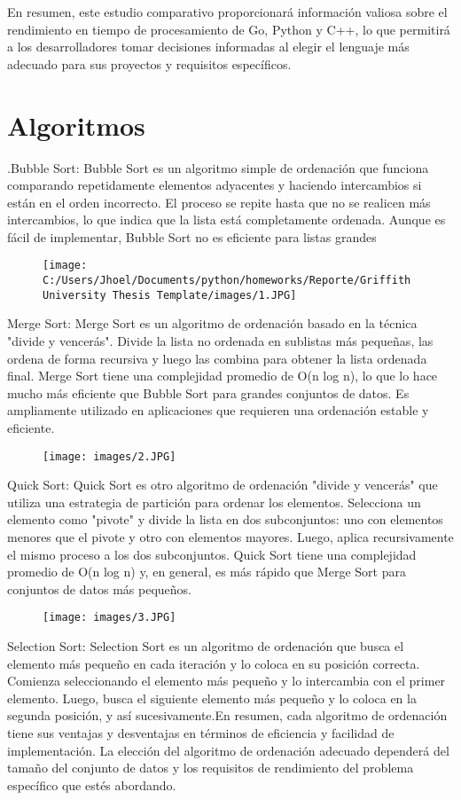 \documentclass[]{report}
\begin{document}
En resumen, este estudio comparativo proporcionará información valiosa sobre el rendimiento en tiempo de procesamiento de Go, Python y C++, lo que permitirá a los desarrolladores tomar decisiones informadas al elegir el lenguaje más adecuado para sus proyectos y requisitos específicos.
\section{Algoritmos}
.Bubble Sort:
Bubble Sort es un algoritmo simple de ordenación que funciona comparando repetidamente elementos adyacentes y haciendo intercambios si están en el orden incorrecto. El proceso se repite hasta que no se realicen más intercambios, lo que indica que la lista está completamente ordenada. Aunque es fácil de implementar, Bubble Sort no es eficiente para listas grandes

\begin{figure}[h]
	\centering
	\texttt{[image: C:/Users/Jhoel/Documents/python/homeworks/Reporte/Griffith University Thesis Template/images/1.JPG]}
	\label{fig:imagen}
\end{figure}

Merge Sort:
Merge Sort es un algoritmo de ordenación basado en la técnica "divide y vencerás". Divide la lista no ordenada en sublistas más pequeñas, las ordena de forma recursiva y luego las combina para obtener la lista ordenada final. Merge Sort tiene una complejidad promedio de O(n log n), lo que lo hace mucho más eficiente que Bubble Sort para grandes conjuntos de datos. Es ampliamente utilizado en aplicaciones que requieren una ordenación estable y eficiente.
\begin{figure}[h]
	\centering
	\texttt{[image: images/2.JPG]}
	\label{fig:imagen}
\end{figure}

Quick Sort:
Quick Sort es otro algoritmo de ordenación "divide y vencerás" que utiliza una estrategia de partición para ordenar los elementos. Selecciona un elemento como "pivote" y divide la lista en dos subconjuntos: uno con elementos menores que el pivote y otro con elementos mayores. Luego, aplica recursivamente el mismo proceso a los dos subconjuntos. Quick Sort tiene una complejidad promedio de O(n log n) y, en general, es más rápido que Merge Sort para conjuntos de datos más pequeños.

\begin{figure}[h]
	\centering
	\texttt{[image: images/3.JPG]}
	\label{fig:imagen}
\end{figure}

Selection Sort:
Selection Sort es un algoritmo de ordenación que busca el elemento más pequeño en cada iteración y lo coloca en su posición correcta. Comienza seleccionando el elemento más pequeño y lo intercambia con el primer elemento. Luego, busca el siguiente elemento más pequeño y lo coloca en la segunda posición, y así sucesivamente.En resumen, cada algoritmo de ordenación tiene sus ventajas y desventajas en términos de eficiencia y facilidad de implementación. La elección del algoritmo de ordenación adecuado dependerá del tamaño del conjunto de datos y los requisitos de rendimiento del problema específico que estés abordando.
\end{document}
